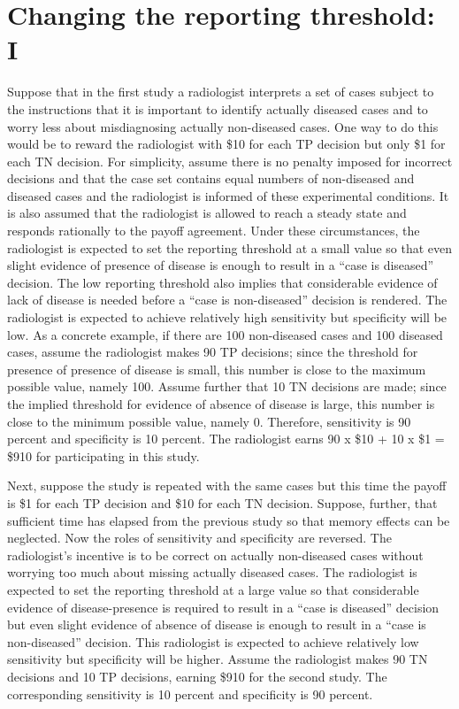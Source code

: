 \documentclass[
]{book}
\begin{document}
\hypertarget{binary-task-model-example-1}{%
\section{Changing the reporting threshold: I}\label{binary-task-model-example-1}}

Suppose that in the first study a radiologist interprets a set of cases subject to the instructions that it is important to identify actually diseased cases and to worry less about misdiagnosing actually non-diseased cases. One way to do this would be to reward the radiologist with \$10 for each TP decision but only \$1 for each TN decision. For simplicity, assume there is no penalty imposed for incorrect decisions and that the case set contains equal numbers of non-diseased and diseased cases and the radiologist is informed of these experimental conditions. It is also assumed that the radiologist is allowed to reach a steady state and responds rationally to the payoff agreement. Under these circumstances, the radiologist is expected to set the reporting threshold at a small value so that even slight evidence of presence of disease is enough to result in a ``case is diseased'' decision. The low reporting threshold also implies that considerable evidence of lack of disease is needed before a ``case is non-diseased'' decision is rendered. The radiologist is expected to achieve relatively high sensitivity but specificity will be low. As a concrete example, if there are 100 non-diseased cases and 100 diseased cases, assume the radiologist makes 90 TP decisions; since the threshold for presence of presence of disease is small, this number is close to the maximum possible value, namely 100. Assume further that 10 TN decisions are made; since the implied threshold for evidence of absence of disease is large, this number is close to the minimum possible value, namely 0. Therefore, sensitivity is 90 percent and specificity is 10 percent. The radiologist earns 90 x \$10 + 10 x \$1 = \$910 for participating in this study.

Next, suppose the study is repeated with the same cases but this time the payoff is \$1 for each TP decision and \$10 for each TN decision. Suppose, further, that sufficient time has elapsed from the previous study so that memory effects can be neglected. Now the roles of sensitivity and specificity are reversed. The radiologist's incentive is to be correct on actually non-diseased cases without worrying too much about missing actually diseased cases. The radiologist is expected to set the reporting threshold at a large value so that considerable evidence of disease-presence is required to result in a ``case is diseased'' decision but even slight evidence of absence of disease is enough to result in a ``case is non-diseased'' decision. This radiologist is expected to achieve relatively low sensitivity but specificity will be higher. Assume the radiologist makes 90 TN decisions and 10 TP decisions, earning \$910 for the second study. The corresponding sensitivity is 10 percent and specificity is 90 percent.
\end{document}
